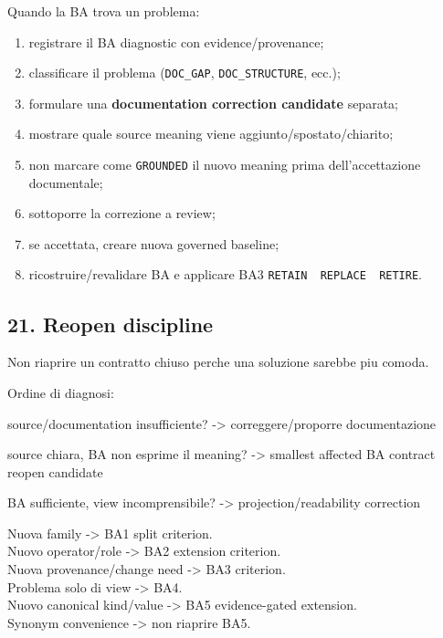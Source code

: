 \documentclass[
  9pt,
  a4paper,
]{article}
\newenvironment{Shaded}{}{}
\newcommand{\NormalTok}[1]{#1}
\providecommand{\tightlist}{%
  \setlength{\itemsep}{0pt}\setlength{\parskip}{0pt}}
\begin{document}
Quando la BA trova un problema:

\begin{enumerate}
\def\labelenumi{\arabic{enumi}.}
\tightlist
\item
  registrare il BA diagnostic con evidence/provenance;
\item
  classificare il problema (\texttt{DOC\_GAP}, \texttt{DOC\_STRUCTURE},
  ecc.);
\item
  formulare una \textbf{documentation correction candidate} separata;
\item
  mostrare quale source meaning viene aggiunto/spostato/chiarito;
\item
  non marcare come \texttt{GROUNDED} il nuovo meaning prima
  dell'accettazione documentale;
\item
  sottoporre la correzione a review;
\item
  se accettata, creare nuova governed baseline;
\item
  ricostruire/revalidare BA e applicare BA3
  \texttt{RETAIN\ \textbar{}\ REPLACE\ \textbar{}\ RETIRE}.
\end{enumerate}

\subsection{21. Reopen discipline}\label{reopen-discipline}

Non riaprire un contratto chiuso perche una soluzione sarebbe piu
comoda.

Ordine di diagnosi:

\begin{Shaded}
\begin{Highlighting}[]
\NormalTok{source/documentation insufficiente?}
\NormalTok{  {-}\textgreater{} correggere/proporre documentazione}

\NormalTok{source chiara, BA non esprime il meaning?}
\NormalTok{  {-}\textgreater{} smallest affected BA contract reopen candidate}

\NormalTok{BA sufficiente, view incomprensibile?}
\NormalTok{  {-}\textgreater{} projection/readability correction}
\end{Highlighting}
\end{Shaded}

Nuova family -\textgreater{} BA1 split criterion.\\
Nuovo operator/role -\textgreater{} BA2 extension criterion.\\
Nuova provenance/change need -\textgreater{} BA3 criterion.\\
Problema solo di view -\textgreater{} BA4.\\
Nuovo canonical kind/value -\textgreater{} BA5 evidence-gated
extension.\\
Synonym convenience -\textgreater{} non riaprire BA5.
\end{document}
